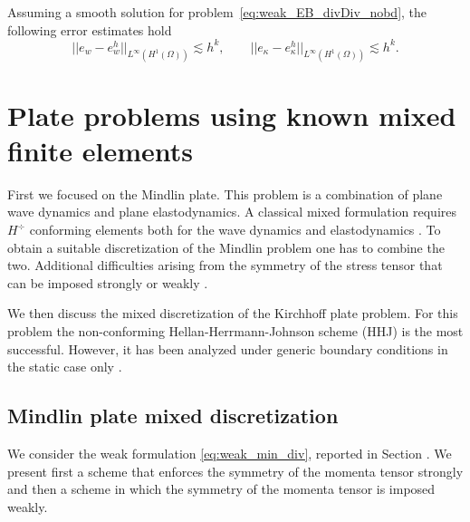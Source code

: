 \begin{conjecture}\label{conj:CGCGestimates}
	Assuming a smooth solution for problem~\eqref{eq:weak_EB_divDiv_nobd}, the following error estimates hold
	\begin{equation}
	\label{eq:errCGCG}
	||e_w - e_w^h||_{L^{\infty} (H^1(\Omega))} \lesssim h^{k}, \qquad
	||e_\kappa - e_\kappa^h||_{L^{\infty} (H^1(\Omega))} \lesssim h^{k}.
	\end{equation}
\end{conjecture}

\section{Plate problems using known mixed finite elements}

First we focused on the Mindlin plate. This problem is a combination of plane wave dynamics and plane elastodynamics. A classical mixed formulation requires $H^{\div}$ conforming elements both for the wave dynamics \cite{becache2000wave} and elastodynamics \cite{becache2001elas,arnold2014elastodynamics}. To obtain a suitable discretization of the Mindlin problem one has to combine the two. Additional difficulties arising from the symmetry of the stress tensor that can be imposed strongly \cite{becache2001elas} or weakly \cite{arnold2014elastodynamics}.

We then discuss the mixed discretization of the Kirchhoff plate problem. For this problem the non-conforming Hellan-Herrmann-Johnson scheme \cite{hellan1967,herrmann1967finite,johnson1973convergence} (HHJ) is the most successful. However, it has been analyzed under generic boundary conditions in the static case only \cite{blum1990}. \\


\subsection{Mindlin plate mixed discretization}
We consider the weak formulation \eqref{eq:weak_min_div}, reported in Section . We present first a scheme that enforces the symmetry of the momenta tensor strongly and then a scheme in which the symmetry of the momenta tensor is imposed weakly.

